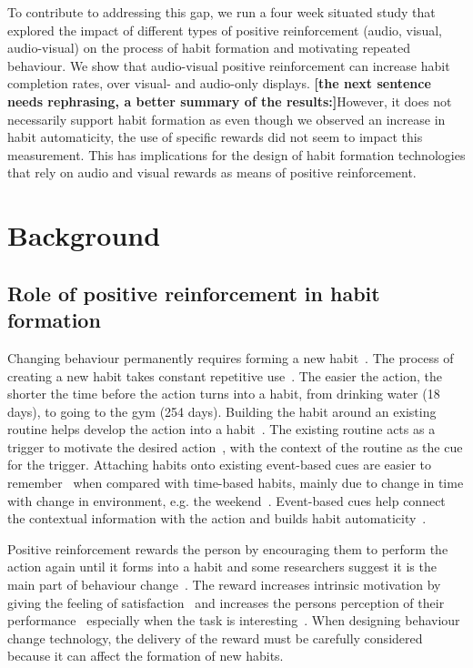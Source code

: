 \documentclass{scaffold/sigchi}
\begin{document}
To contribute to addressing this gap, we run a four week situated study that explored the impact of different types of positive reinforcement (audio, visual, audio-visual) on the process of habit formation and motivating repeated behaviour.
We show that audio-visual positive reinforcement can increase habit completion rates, over visual- and audio-only displays. 
\textbf{[the next sentence needs rephrasing, a better summary of the results:]}However, it does not necessarily support habit formation as even though we observed an increase in habit automaticity, the use of specific rewards did not seem to impact this measurement.
%
This has implications for the design of habit formation technologies that rely on audio and visual rewards as means of positive reinforcement.

\section{Background}
\subsection{Role of positive reinforcement in habit formation}
Changing behaviour permanently requires forming a new habit~\cite{article_experiences_of_habit_formation}. The process of creating a new habit takes constant repetitive use~\cite{article_how_habits_formed_modelling_habit_formation}. The easier the action, the shorter the time before the action turns into a habit, from drinking water (18 days), to going to the gym (254 days). Building the habit around an existing routine helps develop the action into a habit~\cite{habits_event_cues_1}. The existing routine acts as a trigger to motivate the desired action~\cite{habits_event_cues_2}, with the context of the routine as the cue for the trigger. Attaching habits onto existing event-based cues are easier to remember~\cite{article_implementation_intentions_multicue} when compared with time-based habits, mainly due to change in time with change in environment, e.g. the weekend~\cite{coaching_not_that_good}. Event-based cues help connect the contextual information with the action and builds habit automaticity~\cite{article_implementation_intentions}.

Positive reinforcement rewards the person by encouraging them to perform the action again until it forms into a habit and some researchers suggest it is the main part of behaviour change~\cite{article_a_self_efficacy}. The reward increases intrinsic motivation by giving the feeling of satisfaction~\cite{article_promoting_habit_formation} and increases the persons perception of their performance~\cite{positive_reinforcement_pro} especially when the task is interesting~\cite{article_meta_analytic_review_intrinsic_motivation}. When designing behaviour change technology, the delivery of the reward must be carefully considered because it can affect the formation of new habits.
\end{document}
